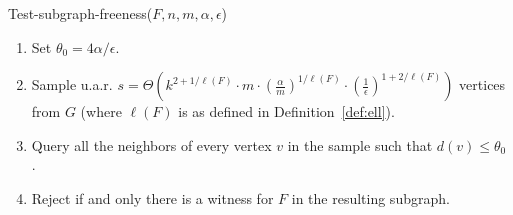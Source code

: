 \medskip
    \textsf{Test-subgraph-freeness}($F,n, m, \alpha, \epsilon$)\label{alg:Ffree}
\begin{enumerate}
\item Set $\theta_0 = 4\alpha/\epsilon$.
\item Sample u.a.r. $s = $$\Theta\left(k^{2+1/\ell(F)} \cdot m \cdot \left(\frac{\alpha}{m }\right)^{1/\ell(F)} \cdot \left(\frac{1}{\epsilon}\right)^{1+2/\ell(F)}\right)$ vertices from $G$ (where $\ell(F)$ is as defined in Definition~\ref{def:ell}).
\item Query all the neighbors of every vertex $v$ in the sample such that $d(v) \leq \theta_0$ .
\item Reject if and only there is a witness for $F$ in the resulting subgraph.
\end{enumerate}

